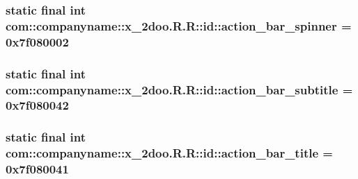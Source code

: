 \hypertarget{classcom_1_1companyname_1_1x__2doo_1_1_r_1_1id_48253f2c379cb4a26c789c8b46cb2027}{
\subsubsection[{action\_\-bar\_\-spinner}]{\setlength{\rightskip}{0pt plus 5cm}static final int com::companyname::x\_\-2doo.R.R::id::action\_\-bar\_\-spinner = 0x7f080002}}
\label{classcom_1_1companyname_1_1x__2doo_1_1_r_1_1id_48253f2c379cb4a26c789c8b46cb2027}


\hypertarget{classcom_1_1companyname_1_1x__2doo_1_1_r_1_1id_78af7eddecae5e0cece59d9d65d95036}{
\subsubsection[{action\_\-bar\_\-subtitle}]{\setlength{\rightskip}{0pt plus 5cm}static final int com::companyname::x\_\-2doo.R.R::id::action\_\-bar\_\-subtitle = 0x7f080042}}
\label{classcom_1_1companyname_1_1x__2doo_1_1_r_1_1id_78af7eddecae5e0cece59d9d65d95036}


\hypertarget{classcom_1_1companyname_1_1x__2doo_1_1_r_1_1id_a48beed314fd3180593d9e6a1298cae5}{
\subsubsection[{action\_\-bar\_\-title}]{\setlength{\rightskip}{0pt plus 5cm}static final int com::companyname::x\_\-2doo.R.R::id::action\_\-bar\_\-title = 0x7f080041}}
\label{classcom_1_1companyname_1_1x__2doo_1_1_r_1_1id_a48beed314fd3180593d9e6a1298cae5}


